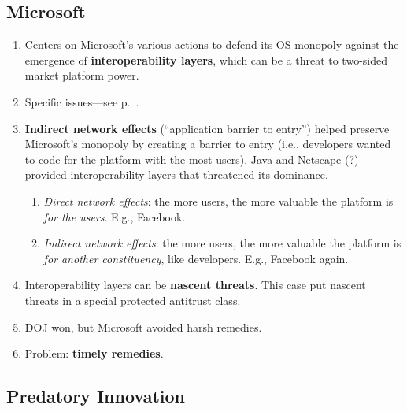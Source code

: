 \subsection{Microsoft}

\begin{enumerate}
    \item Centers on Microsoft's various actions to defend its OS monopoly 
    against the emergence of \textbf{interoperability layers}, which can be a 
    threat to two-sided market platform power.
    \item Specific issues---see p.~\pageref{sub:msft-issues}.
    \item \textbf{Indirect network effects} (``application barrier to entry'') 
    helped preserve Microsoft's monopoly by creating a barrier to entry (i.e., 
    developers wanted to code for the platform with the most users). Java and 
    Netscape (?) provided interoperability layers that threatened its 
    dominance.
    \begin{enumerate}
        \item \emph{Direct network effects}: the more users, the more valuable 
        the platform is \emph{for the users}. E.g., Facebook.
        \item \emph{Indirect network effects}: the more users, the more 
        valuable the platform is \emph{for another constituency}, like 
        developers. E.g., Facebook again.
    \end{enumerate}
    \item Interoperability layers can be \textbf{nascent threats}. This case 
    put nascent threats in a special protected antitrust class.
    \item DOJ won, but Microsoft avoided harsh remedies.
    \item Problem: \textbf{timely remedies}.
\end{enumerate}

\subsection{Predatory Innovation}

